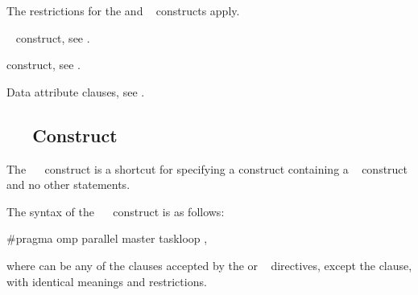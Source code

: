 \restrictions
The restrictions for the  and ~ 
constructs apply.

\begin{crossrefs}
\item {}~ construct, see
.

\item {} construct, see
.

\item Data attribute clauses, see
.
\end{crossrefs}




\subsection{~~ Construct}
\label{subsec:parallel master taskloop Construct}

\summary
The ~~ construct is a shortcut for 
specifying a  construct containing a ~
construct and no other statements.

\syntax
\begin{ccppspecific}
The syntax of the ~~ construct is as 
follows:

\begin{ompcPragma}
#pragma omp parallel master taskloop \plc{[clause[ [},\plc{] clause] ... ] new-line}
\end{ompcPragma}

where  can be any of the clauses accepted by the  
or ~ directives, except the  clause,
with identical meanings and restrictions.
\end{ccppspecific}

